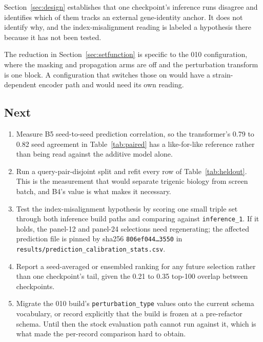 Section~\ref{sec:design} establishes that one checkpoint's inference runs
disagree and identifies which of them tracks an external gene-identity anchor.
It does not identify why, and the index-misalignment reading is labeled a
hypothesis there because it has not been tested.

The reduction in Section~\ref{sec:setfunction} is specific to the 010
configuration, where the masking and propagation arms are off and the
perturbation transform is one block. A configuration that switches those on
would have a strain-dependent encoder path and would need its own reading.

\subsection{Next}

\begin{enumerate}
\item Measure B5 seed-to-seed prediction correlation, so the transformer's
  0.79 to 0.82 seed agreement in Table~\ref{tab:paired} has a like-for-like
  reference rather than being read against the additive model alone.
\item Run a query-pair-disjoint split and refit every row of
  Table~\ref{tab:heldout}. This is the measurement that would separate trigenic
  biology from screen batch, and B4's value is what makes it necessary.
\item Test the index-misalignment hypothesis by scoring one small triple set
  through both inference build paths and comparing against
  \texttt{inference\_1}. If it holds, the panel-12 and panel-24 selections need
  regenerating; the affected prediction file is pinned by sha256
  \texttt{806ef044\ldots 3550} in
  \texttt{results/prediction\_calibration\_stats.csv}.
\item Report a seed-averaged or ensembled ranking for any future selection
  rather than one checkpoint's tail, given the 0.21 to 0.35 top-100 overlap
  between checkpoints.
\item Migrate the 010 build's \texttt{perturbation\_type} values onto the
  current schema vocabulary, or record explicitly that the build is frozen at a
  pre-refactor schema. Until then the stock evaluation path cannot run against
  it, which is what made the per-record comparison hard to obtain.
\end{enumerate}
